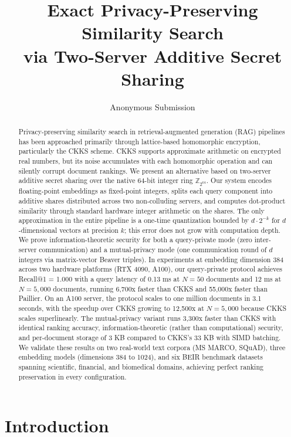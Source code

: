 \documentclass[11pt]{article}
\title{Exact Privacy-Preserving Similarity Search \\
via Two-Server Additive Secret Sharing}
\author{Anonymous Submission}
\date{}
\newcommand{\Z}{\mathbb{Z}}
\begin{document}
\maketitle

\begin{abstract}
Privacy-preserving similarity search in retrieval-augmented generation (RAG) pipelines has been approached primarily through lattice-based homomorphic encryption, particularly the CKKS scheme. CKKS supports approximate arithmetic on encrypted real numbers, but its noise accumulates with each homomorphic operation and can silently corrupt document rankings. We present an alternative based on two-server additive secret sharing over the native 64-bit integer ring $\Z_{2^{64}}$. Our system encodes floating-point embeddings as fixed-point integers, splits each query component into additive shares distributed across two non-colluding servers, and computes dot-product similarity through standard hardware integer arithmetic on the shares. The only approximation in the entire pipeline is a one-time quantization bounded by $d \cdot 2^{-k}$ for $d$-dimensional vectors at precision $k$; this error does not grow with computation depth. We prove information-theoretic security for both a query-private mode (zero inter-server communication) and a mutual-privacy mode (one communication round of $d$ integers via matrix-vector Beaver triples). In experiments at embedding dimension 384 across two hardware platforms (RTX 4090, A100), our query-private protocol achieves Recall@1 = 1.000 with a query latency of 0.13 ms at $N = 50$ documents and 12 ms at $N = 5{,}000$ documents, running 6{,}700x faster than CKKS and 55{,}000x faster than Paillier. On an A100 server, the protocol scales to one million documents in 3.1 seconds, with the speedup over CKKS growing to 12{,}500x at $N = 5{,}000$ because CKKS scales superlinearly. The mutual-privacy variant runs 3{,}300x faster than CKKS with identical ranking accuracy, information-theoretic (rather than computational) security, and per-document storage of 3 KB compared to CKKS's 33 KB with SIMD batching. We validate these results on two real-world text corpora (MS MARCO, SQuAD), three embedding models (dimensions 384 to 1024), and six BEIR benchmark datasets spanning scientific, financial, and biomedical domains, achieving perfect ranking preservation in every configuration.
\end{abstract}


\section{Introduction}
\label{sec:intro}
\end{document}
